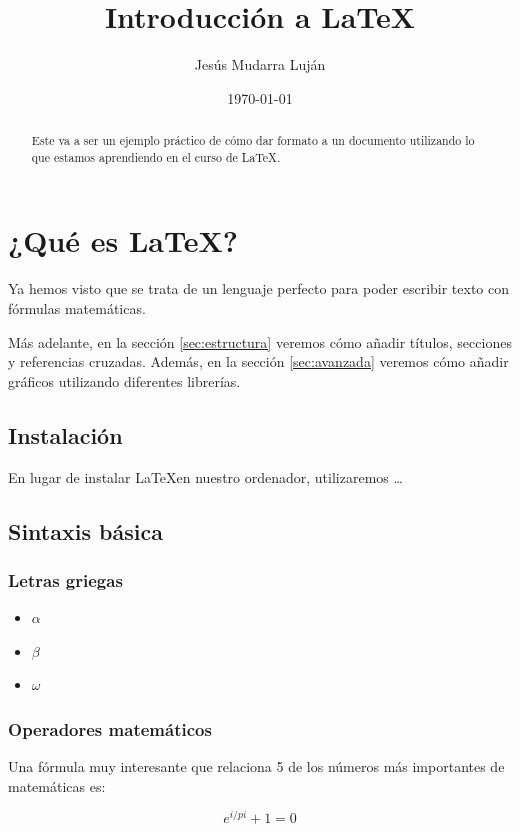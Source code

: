 \documentclass[12pt]{article}
\title{Introducción a \LaTeX}
\author{Jesús Mudarra Luján}
\date{\today}
\begin{document}
\maketitle

\tableofcontents

\begin{abstract}
    Este va a ser un ejemplo práctico de cómo dar formato a un documento utilizando lo que estamos aprendiendo en el curso de \LaTeX.
\end{abstract}

\section{¿Qué es \LaTeX?}
\label{sec:quees}
Ya hemos visto que se trata de un lenguaje perfecto para poder escribir texto con fórmulas matemáticas.

Más adelante, en la sección \ref{sec:estructura} veremos cómo añadir títulos, secciones y referencias cruzadas. Además, en la sección \ref{sec:avanzada} veremos cómo añadir gráficos utilizando diferentes librerías.

\subsection*{Instalación}
En lugar de instalar \LaTeX en nuestro ordenador, utilizaremos \ldots

\subsection{Sintaxis básica}

\subsubsection{Letras griegas}
\begin{itemize}
    \item $\alpha$
    \item $\beta$
    \item $\omega$
    
\end{itemize}


\subsubsection{Operadores matemáticos}
Una fórmula muy interesante que relaciona 5 de los números más importantes de matemáticas es:

\begin{equation}
\label{eq:euler}
    e^{i/pi} + 1 = 0
\end{equation}
\end{document}
